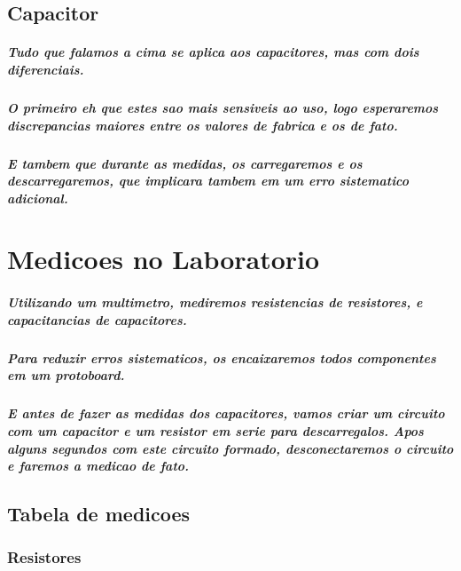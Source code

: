 \documentclass[12pt,twoside, a4paper, twocolumn]{article}
\begin{document}
\subsection{Capacitor}

\subparagraph*{Tudo que falamos a cima se aplica aos capacitores, mas com dois diferenciais.}

\subparagraph*{O primeiro eh que estes sao mais sensiveis ao uso, logo esperaremos discrepancias maiores entre os valores de fabrica e os de fato.}

\subparagraph*{E tambem que durante as medidas, os carregaremos e os descarregaremos, que implicara tambem em um erro sistematico adicional.}


\section{Medicoes no Laboratorio}

\subparagraph*{Utilizando um multimetro, mediremos resistencias de resistores, e capacitancias de capacitores.}

\subparagraph*{Para reduzir erros sistematicos, os encaixaremos todos componentes em um protoboard.}

\subparagraph*{E antes de fazer as medidas dos capacitores, vamos criar um circuito com um capacitor e um resistor em serie para descarregalos. Apos alguns segundos com este circuito formado, desconectaremos o circuito e faremos a medicao de fato.}

\subsection{Tabela de medicoes}

\subsubsection{Resistores}
\end{document}
